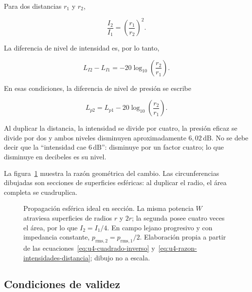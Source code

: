 Para dos distancias \(r_1\) y \(r_2\),

\begin{equation}
    \frac{I_2}{I_1}
      =\left(\frac{r_1}{r_2}\right)^2.
    \label{eq:u4-razon-intensidades-distancia}
\end{equation}

La diferencia de nivel de intensidad es, por lo tanto,

\begin{equation}
    L_{I2}-L_{I1}
      =-20\log_{10}\!\left(\frac{r_2}{r_1}\right).
    \label{eq:u4-nivel-intensidad-distancia}
\end{equation}

 En esas condiciones, la diferencia de nivel de presión se escribe

\begin{equation}
    L_{p2}
      =L_{p1}-20\log_{10}\!\left(\frac{r_2}{r_1}\right).
    \label{eq:u4-nivel-presion-distancia}
\end{equation}

Al duplicar la distancia, la intensidad se divide por cuatro, la presión
eficaz se divide por dos y ambos niveles disminuyen aproximadamente
\(6{,}02\,\text{dB}\). No se debe decir que la ``intensidad cae
\(6\,\text{dB}\)'': disminuye por un factor cuatro; lo que disminuye en
decibeles es su nivel.

La figura~\ref{fig:u4-propagacion-esferica} muestra la razón geométrica del
cambio. Las circunferencias dibujadas son secciones de superficies esféricas:
al duplicar el radio, el área completa se cuadruplica.

\begin{figure}[htbp]
    \centering
    
    \caption{Propagación esférica ideal en sección. La misma potencia \(W\)
    atraviesa superficies de radios \(r\) y \(2r\); la segunda posee cuatro
    veces el área, por lo que \(I_2=I_1/4\). En campo lejano progresivo y con
    impedancia constante, \(p_{\mathrm{rms},2}=p_{\mathrm{rms},1}/2\).
    Elaboración propia a partir de las
    ecuaciones~\eqref{eq:u4-cuadrado-inverso}
    y~\eqref{eq:u4-razon-intensidades-distancia}; dibujo no a escala.}
    \label{fig:u4-propagacion-esferica}
\end{figure}

\subsection{Condiciones de validez}
\label{sec:u4-condiciones-cuadrado-inverso}

